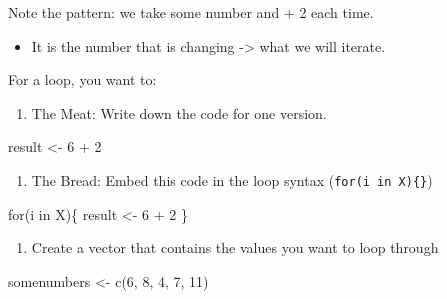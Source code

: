 \documentclass[
  letterpaper,
  DIV=11,
  numbers=noendperiod]{scrreprt}
\newenvironment{Shaded}{\begin{snugshade}}{\end{snugshade}}
\newcommand{\ControlFlowTok}[1]{\textcolor[rgb]{0.00,0.23,0.31}{#1}}
\newcommand{\DecValTok}[1]{\textcolor[rgb]{0.68,0.00,0.00}{#1}}
\newcommand{\FunctionTok}[1]{\textcolor[rgb]{0.28,0.35,0.67}{#1}}
\newcommand{\NormalTok}[1]{\textcolor[rgb]{0.00,0.23,0.31}{#1}}
\newcommand{\OtherTok}[1]{\textcolor[rgb]{0.00,0.23,0.31}{#1}}
\newcommand{\SpecialCharTok}[1]{\textcolor[rgb]{0.37,0.37,0.37}{#1}}
\providecommand{\tightlist}{%
  \setlength{\itemsep}{0pt}\setlength{\parskip}{0pt}}\usepackage{longtable,booktabs,array}
\begin{document}
Note the pattern: we take some number and + 2 each time.

\begin{itemize}
\tightlist
\item
  It is the number that is changing -\textgreater{} what we will
  iterate.
\end{itemize}

For a loop, you want to:

\begin{enumerate}
\def\labelenumi{\arabic{enumi}.}
\tightlist
\item
  The Meat: Write down the code for one version.
\end{enumerate}

\begin{Shaded}
\begin{Highlighting}[]
\NormalTok{result }\OtherTok{\textless{}{-}} \DecValTok{6} \SpecialCharTok{+} \DecValTok{2}
\end{Highlighting}
\end{Shaded}

\begin{enumerate}
\def\labelenumi{\arabic{enumi}.}
\setcounter{enumi}{1}
\tightlist
\item
  The Bread: Embed this code in the loop syntax
  (\texttt{for(i\ in\ X)\{\}})
\end{enumerate}

\begin{Shaded}
\begin{Highlighting}[]
\ControlFlowTok{for}\NormalTok{(i }\ControlFlowTok{in}\NormalTok{ X)\{}
\NormalTok{    result }\OtherTok{\textless{}{-}} \DecValTok{6} \SpecialCharTok{+} \DecValTok{2}
\NormalTok{    \}}
\end{Highlighting}
\end{Shaded}

\begin{enumerate}
\def\labelenumi{\arabic{enumi}.}
\setcounter{enumi}{2}
\tightlist
\item
  Create a vector that contains the values you want to loop through
\end{enumerate}

\begin{Shaded}
\begin{Highlighting}[]
\NormalTok{somenumbers }\OtherTok{\textless{}{-}} \FunctionTok{c}\NormalTok{(}\DecValTok{6}\NormalTok{, }\DecValTok{8}\NormalTok{, }\DecValTok{4}\NormalTok{, }\DecValTok{7}\NormalTok{, }\DecValTok{11}\NormalTok{)}
\end{Highlighting}
\end{Shaded}
\end{document}
